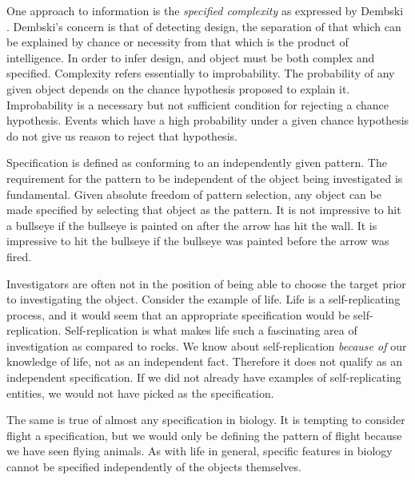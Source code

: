 One approach to information is the \textit{specified complexity} as expressed by Dembski \citep{Dembski1998}.
Dembski's concern is that of detecting design, the separation of that which can be explained by chance or necessity from that which is the product of intelligence. 
In order to infer design, and object must be both complex and specified.
Complexity refers essentially to improbability.
The probability of any given object depends on the chance hypothesis proposed to explain it.
Improbability is a necessary but not sufficient condition for rejecting a chance hypothesis.
Events which have a high probability under a given chance hypothesis do not give us reason to reject that hypothesis.

Specification is defined as conforming to an independently given pattern.
The requirement for the pattern to be independent of the object being investigated is fundamental.
Given absolute freedom of pattern selection, any object can be made specified by selecting that object as the pattern.
It is not impressive to hit a bullseye if the bullseye is painted on after the arrow has hit the wall.
It is impressive to hit the bullseye if the bullseye was painted before the arrow was fired.

Investigators are often not in the position of being able to choose the target prior to investigating the object.
Consider the example of life.
Life is a self-replicating process, and it would seem that an appropriate specification would be self-replication.
Self-replication is what makes life such a fascinating area of investigation as compared to rocks.
We know about self-replication \emph{because of} our knowledge of life, not as an independent fact.
Therefore it does not qualify as an independent specification.
If we did not already have examples of self-replicating entities, we would not have picked as the specification.

The same is true of almost any specification in biology.
It is tempting to consider flight a specification, but we would only be defining the pattern of flight because we have seen flying animals.
As with life in general, specific features in biology cannot be specified independently of the objects themselves.

